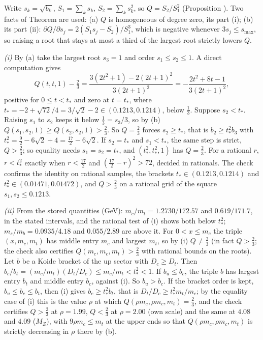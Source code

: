 Write $s_{k} = \sqrt{b_{k}}$, $S_{1} = \sum_{k}s_{k}$, $S_{2} = \sum_{k}s_{k}^{2}$, so $Q = S_{2}/S_{1}^{2}$ (Proposition ). Two facts of Theorem  are used: (a) $Q$ is homogeneous of degree zero, its part (i); (b) its part (ii): $\partial Q/\partial s_{j} = 2(S_{1}s_{j} - S_{2})/S_{1}^{3}$, which is negative whenever $3s_{j} \le s_{\max}$, so raising a root that stays at most a third of the largest root strictly lowers $Q$.

\emph{(i)} By (a) take the largest root $s_{3} = 1$ and order $s_{1} \le s_{2} \le 1$. A direct computation gives
\[
Q(t, t, 1) - \tfrac23 = \frac{3(2t^{2} + 1) - 2(2t + 1)^{2}}{3(2t + 1)^{2}} = -\frac{2t^{2} + 8t - 1}{3(2t + 1)^{2}},
\]
positive for $0 \le t < t_{*}$ and zero at $t = t_{*}$, where $t_{*} = -2 + \sqrt{72}/4 = 3/\sqrt{2} - 2 \in (0.1213, 0.1214)$, below $\tfrac13$. Suppose $s_{2} < t_{*}$. Raising $s_{1}$ to $s_{2}$ keeps it below $\tfrac13 = s_{3}/3$, so by (b) $Q(s_{1}, s_{2}, 1) \ge Q(s_{2}, s_{2}, 1) > \tfrac23$. So $Q = \tfrac23$ forces $s_{2} \ge t_{*}$, that is $b_{2} \ge t_{*}^{2}b_{3}$ with $t_{*}^{2} = \tfrac92 - 6\sqrt{2} + 4 = \tfrac{17}{2} - 6\sqrt{2}$. If $s_{2} = t_{*}$ and $s_{1} < t_{*}$, the same step is strict, $Q > \tfrac23$; so equality needs $s_{1} = s_{2} = t_{*}$, and $(t_{*}^{2}, t_{*}^{2}, 1)$ has $Q = \tfrac23$. For a rational $r$, $r < t_{*}^{2}$ exactly when $r < \tfrac{17}{2}$ and $(\tfrac{17}{2} - r)^{2} > 72$, decided in rationals. The check confirms the identity on rational samples, the brackets $t_{*} \in (0.1213, 0.1214)$ and $t_{*}^{2} \in (0.01471, 0.01472)$, and $Q > \tfrac23$ on a rational grid of the square $s_{1}, s_{2} \le 0.1213$.

\emph{(ii)} From the stored quantities (GeV): $m_{c}/m_{t} = 1.2730/172.57$ and $0.619/171.7$, in the stated intervals, and the rational test of (i) shows both below $t_{*}^{2}$; $m_{s}/m_{b} = 0.0935/4.18$ and $0.055/2.89$ are above it. For $0 < x \le m_{c}$ the triple $(x, m_{c}, m_{t})$ has middle entry $m_{c}$ and largest $m_{t}$, so by (i) $Q \ne \tfrac23$ (in fact $Q > \tfrac23$; the check also certifies $Q(m_{c}, m_{c}, m_{t}) > \tfrac23$ with rational bounds on the roots). Let $b$ be a Koide bracket of the up sector with $D_{c} \ge D_{t}$. Then $b_{c}/b_{t} = (m_{c}/m_{t})(D_{t}/D_{c}) \le m_{c}/m_{t} < t_{*}^{2} < 1$. If $b_{u} \le b_{c}$, the triple $b$ has largest entry $b_{t}$ and middle entry $b_{c}$, against (i). So $b_{u} > b_{c}$. If the bracket order is kept, $b_{u} \le b_{c} \le b_{t}$, then (i) gives $b_{c} \ge t_{*}^{2}b_{t}$, that is $D_{t}/D_{c} \ge t_{*}^{2}m_{t}/m_{c}$; by the equality case of (i) this is the value $\rho$ at which $Q(\rho m_{c}, \rho m_{c}, m_{t}) = \tfrac23$, and the check certifies $Q > \tfrac23$ at $\rho = 1.99$, $Q < \tfrac23$ at $\rho = 2.00$ (own scale) and the same at $4.08$ and $4.09$ ($M_{Z}$), with $9\rho m_{c} \le m_{t}$ at the upper ends so that $Q(\rho m_{c}, \rho m_{c}, m_{t})$ is strictly decreasing in $\rho$ there by (b).

